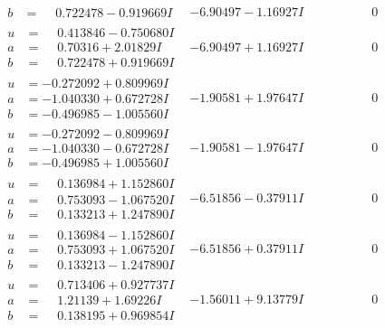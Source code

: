 \documentclass[1p]{elsarticle_modified}
\theoremstyle{definition}
\begin{document}
$$\begin{array}{c|c|c}
\begin{aligned}
b &= \phantom{-}0.722478 - 0.919669 I\end{aligned}
 & -6.90497 - 1.16927 I & \phantom{-0.000000 } 0 \\ \hline\begin{aligned}
u &= \phantom{-}0.413846 - 0.750680 I \\
a &= \phantom{-}0.70316 + 2.01829 I \\
b &= \phantom{-}0.722478 + 0.919669 I\end{aligned}
 & -6.90497 + 1.16927 I & \phantom{-0.000000 } 0 \\ \hline\begin{aligned}
u &= -0.272092 + 0.809969 I \\
a &= -1.040330 + 0.672728 I \\
b &= -0.496985 - 1.005560 I\end{aligned}
 & -1.90581 + 1.97647 I & \phantom{-0.000000 } 0 \\ \hline\begin{aligned}
u &= -0.272092 - 0.809969 I \\
a &= -1.040330 - 0.672728 I \\
b &= -0.496985 + 1.005560 I\end{aligned}
 & -1.90581 - 1.97647 I & \phantom{-0.000000 } 0 \\ \hline\begin{aligned}
u &= \phantom{-}0.136984 + 1.152860 I \\
a &= \phantom{-}0.753093 - 1.067520 I \\
b &= \phantom{-}0.133213 + 1.247890 I\end{aligned}
 & -6.51856 - 0.37911 I & \phantom{-0.000000 } 0 \\ \hline\begin{aligned}
u &= \phantom{-}0.136984 - 1.152860 I \\
a &= \phantom{-}0.753093 + 1.067520 I \\
b &= \phantom{-}0.133213 - 1.247890 I\end{aligned}
 & -6.51856 + 0.37911 I & \phantom{-0.000000 } 0 \\ \hline\begin{aligned}
u &= \phantom{-}0.713406 + 0.927737 I \\
a &= \phantom{-}1.21139 + 1.69226 I \\
b &= \phantom{-}0.138195 + 0.969854 I\end{aligned}
 & -1.56011 + 9.13779 I & \phantom{-0.000000 } 0 \\ \hline\begin{aligned}

\end{aligned}
\end{array}$$
\end{document}

